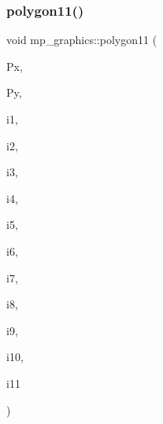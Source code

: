 \mbox{\label{classmp__graphics_a910527e7875deb1b2f4184cbf41cdb5f}} 
\subsubsection{\texorpdfstring{polygon11()}{polygon11()}}
{\footnotesize\ttfamily void mp\+\_\+graphics\+::polygon11 (\begin{DoxyParamCaption}\item[{\mbox{\hyperlink{galois_8h_a09fddde158a3a20bd2dcadb609de11dc}{I\+NT}} $\ast$}]{Px,  }\item[{\mbox{\hyperlink{galois_8h_a09fddde158a3a20bd2dcadb609de11dc}{I\+NT}} $\ast$}]{Py,  }\item[{\mbox{\hyperlink{galois_8h_a09fddde158a3a20bd2dcadb609de11dc}{I\+NT}}}]{i1,  }\item[{\mbox{\hyperlink{galois_8h_a09fddde158a3a20bd2dcadb609de11dc}{I\+NT}}}]{i2,  }\item[{\mbox{\hyperlink{galois_8h_a09fddde158a3a20bd2dcadb609de11dc}{I\+NT}}}]{i3,  }\item[{\mbox{\hyperlink{galois_8h_a09fddde158a3a20bd2dcadb609de11dc}{I\+NT}}}]{i4,  }\item[{\mbox{\hyperlink{galois_8h_a09fddde158a3a20bd2dcadb609de11dc}{I\+NT}}}]{i5,  }\item[{\mbox{\hyperlink{galois_8h_a09fddde158a3a20bd2dcadb609de11dc}{I\+NT}}}]{i6,  }\item[{\mbox{\hyperlink{galois_8h_a09fddde158a3a20bd2dcadb609de11dc}{I\+NT}}}]{i7,  }\item[{\mbox{\hyperlink{galois_8h_a09fddde158a3a20bd2dcadb609de11dc}{I\+NT}}}]{i8,  }\item[{\mbox{\hyperlink{galois_8h_a09fddde158a3a20bd2dcadb609de11dc}{I\+NT}}}]{i9,  }\item[{\mbox{\hyperlink{galois_8h_a09fddde158a3a20bd2dcadb609de11dc}{I\+NT}}}]{i10,  }\item[{\mbox{\hyperlink{galois_8h_a09fddde158a3a20bd2dcadb609de11dc}{I\+NT}}}]{i11 }\end{DoxyParamCaption})}

\mbox{\label{classmp__graphics_ad4052be9dec4eeef879dcc8ca6d85d71}} 
